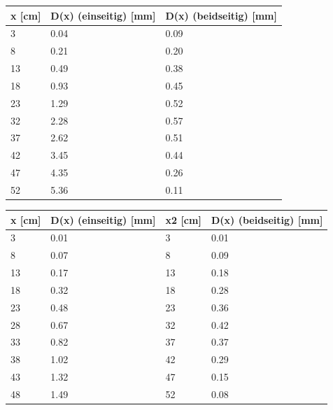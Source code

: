 \begin{minipage}{\linewidth}
    \begin{table}[H]
        \centering
    \begin{tabular}{lll}
        \toprule
        x [cm] & D(x) (einseitig) [mm] & D(x) (beidseitig) [mm] \\
        \midrule
        3  & 0.04 & 0.09 \\
        8  & 0.21 & 0.20 \\
        13 & 0.49 & 0.38 \\
        18 & 0.93 & 0.45 \\
        23 & 1.29 & 0.52 \\
        32 & 2.28 & 0.57 \\
        37 & 2.62 & 0.51 \\
        42 & 3.45 & 0.44 \\
        47 & 4.35 & 0.26 \\
        52 & 5.36 & 0.11 \\
        \bottomrule   
    \end{tabular}
    
    \label{tab:2}
\end{table}
\end{minipage}

\begin{minipage}{\linewidth}
    \begin{table}[H]
        \centering
    \begin{tabular}{llll}
        \toprule
        x [cm] & D(x) (einseitig) [mm] & x2 [cm] & D(x) (beidseitig) [mm] \\
        \midrule
        3  & 0.01 & 3  & 0.01 \\ 
        8  & 0.07 & 8  & 0.09 \\ 
        13 & 0.17 & 13 & 0.18 \\ 
        18 & 0.32 & 18 & 0.28 \\ 
        23 & 0.48 & 23 & 0.36 \\ 
        28 & 0.67 & 32 & 0.42 \\ 
        33 & 0.82 & 37 & 0.37 \\ 
        38 & 1.02 & 42 & 0.29 \\ 
        43 & 1.32 & 47 & 0.15 \\ 
        48 & 1.49 & 52 & 0.08 \\ 
        \bottomrule   
    \end{tabular}
    
    \label{tab:3}
\end{table}
\end{minipage}

